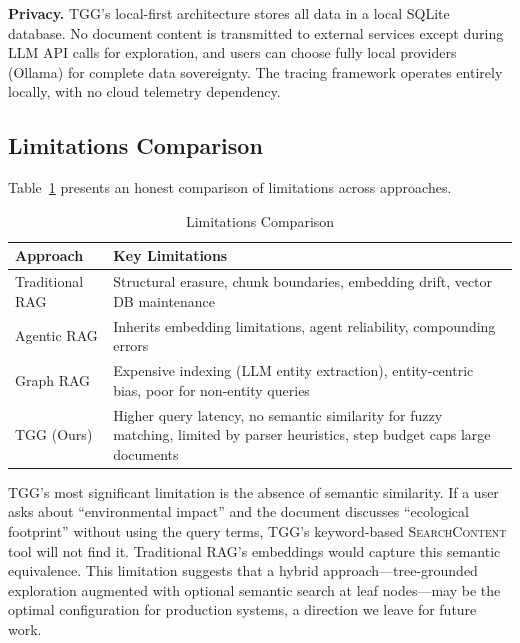 \documentclass[conference]{IEEEtran}
\begin{document}
\textbf{Privacy.} TGG's local-first architecture stores all data in a local SQLite database. No document content is transmitted to external services except during LLM API calls for exploration, and users can choose fully local providers (Ollama) for complete data sovereignty. The tracing framework operates entirely locally, with no cloud telemetry dependency.

\subsection{Limitations Comparison}

Table~\ref{tab:limitations} presents an honest comparison of limitations across approaches.

\begin{table}[t]
\centering
\caption{Limitations Comparison}
\label{tab:limitations}
\footnotesize
\begin{tabular}{@{}p{2.0cm}p{5.8cm}@{}}
\toprule
\textbf{Approach} & \textbf{Key Limitations} \\
\midrule
Traditional RAG & Structural erasure, chunk boundaries, embedding drift, vector DB maintenance \\
\addlinespace
Agentic RAG & Inherits embedding limitations, agent reliability, compounding errors \\
\addlinespace
Graph RAG & Expensive indexing (LLM entity extraction), entity-centric bias, poor for non-entity queries \\
\addlinespace
TGG (Ours) & Higher query latency, no semantic similarity for fuzzy matching, limited by parser heuristics, step budget caps large documents \\
\bottomrule
\end{tabular}
\end{table}

TGG's most significant limitation is the absence of semantic similarity. If a user asks about ``environmental impact'' and the document discusses ``ecological footprint'' without using the query terms, TGG's keyword-based \textsc{SearchContent} tool will not find it. Traditional RAG's embeddings would capture this semantic equivalence. This limitation suggests that a hybrid approach---tree-grounded exploration augmented with optional semantic search at leaf nodes---may be the optimal configuration for production systems, a direction we leave for future work.

\end{document}
